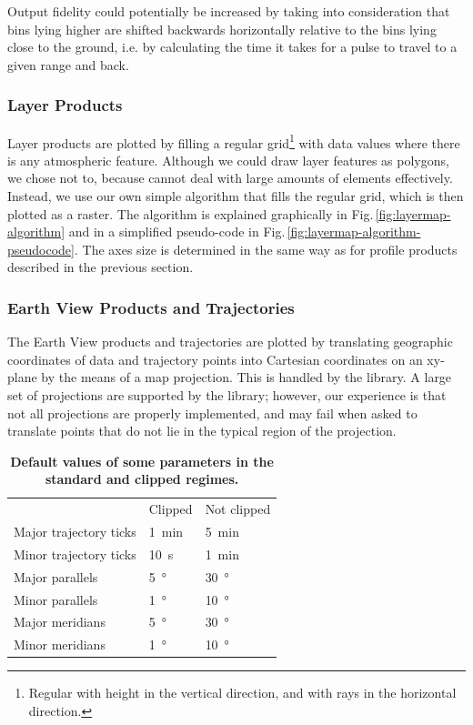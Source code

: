 Output fidelity could potentially be increased by taking into consideration that
bins lying higher are shifted backwards horizontally relative to the bins lying
close to the ground, i.e. by calculating the time it takes for a pulse to travel
to a given range and back.


\subsubsection{Layer Products}
Layer products are plotted by filling a regular grid\footnote{Regular with
height in the vertical direction, and with rays in the horizontal direction.}
with data values where there is any atmospheric feature.  Although we could draw
layer features as polygons, we chose not to, because  cannot deal with
large amounts of elements effectively. Instead, we use our own simple algorithm
that fills the regular grid, which is then plotted as a raster. The algorithm is
explained graphically in Fig.\,\ref{fig:layermap-algorithm} and in a simplified
pseudo-code in Fig.\,\ref{fig:layermap-algorithm-pseudocode}. The axes size is
determined in the same way as for profile products described in the previous
section.


\subsubsection{Earth View Products and Trajectories}
The Earth View products and trajectories are plotted by translating geographic
coordinates of data and trajectory points into Cartesian coordinates on an
xy-plane by the means of a map projection. This is handled by the
 library. A large set of projections are supported by the
library; however, our experience is that not all projections are properly
implemented, and may fail when asked to translate points that do not lie in the
typical region of the projection.

\begin{table}[t]
\caption[Default values of some parameters in the standard and clipped regimes]{\textbf{Default values of some parameters in the standard and clipped regimes.}}
\label{tab:clipped-parameters}
\begin{tabularx}{\textwidth}{X l l}
			&Clipped		&Not clipped\\
\tophline
Major trajectory ticks	&\SI{1}{min}		&\SI{5}{min}\\
Minor trajectory ticks	&\SI{10}{s}		&\SI{1}{min}\\
Major parallels		&\SI{5}{\degree}	&\SI{30}{\degree}\\
Minor parallels		&\SI{1}{\degree}	&\SI{10}{\degree}\\
Major meridians		&\SI{5}{\degree}	&\SI{30}{\degree}\\
Minor meridians		&\SI{1}{\degree}	&\SI{10}{\degree}
\end{tabularx}
\end{table}

